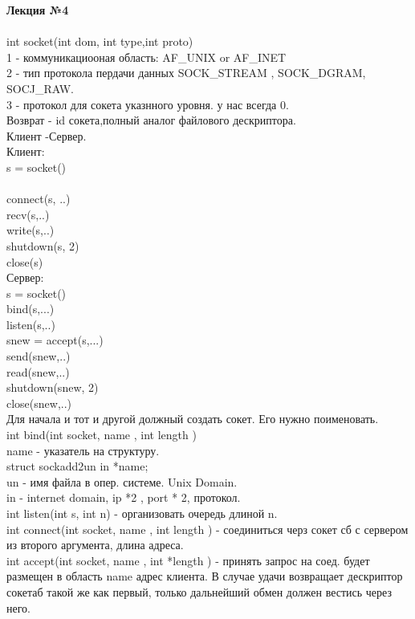 

\LARGE{ \textbf {Лекция №4}}\\
\Large{ \textbf {}}\\

int socket(int dom, int type,int proto)\\
1 - коммуникациооная область: AF_UNIX or AF_INET\\
2 - тип протокола пердачи данных SOCK_STREAM , SOCK_DGRAM, SOCJ_RAW.\\
3 - протокол для сокета указнного уровня. у нас всегда 0.\\
Возврат - id сокета,полный аналог файлового дескриптора.\\

Клиент -Сервер.\\
Клиент:\\
s = socket()\\
[bind(s,..)]\\
connect(s, ..)\\
recv(s,..)\\
write(s,..)\\
shutdown(s, 2)\\
close(s) \\

Сервер: \\
s = socket()\\
bind(s,...)\\
listen(s,..)\\
snew = accept(s,...)\\
send(snew,..)\\
read(snew,..)\\
shutdown(snew, 2)\\
close(snew,..)\\



Для начала и тот и другой должный создать сокет. Его нужно поименовать.\\
int bind(int socket, name , int length )\\
name - указатель на структуру.\\
struct sockadd2{un in} *name;\\
un - имя файла в опер. системе. Unix Domain.  \\
in - internet domain, ip *2 , port * 2, протокол. \\

int listen(int s, int n) - организовать очередь длиной n.\\
int connect(int socket, name , int length ) - соединиться черз сокет сб с сервером из второго аргумента, длина адреса.\\
int accept(int socket, name , int *length ) - принять запрос на соед. будет размещен в область name адрес клиента.
В случае удачи возвращает дескриптор сокетаб такой же как первый, только дальнейший обмен должен вестись через него.\\

